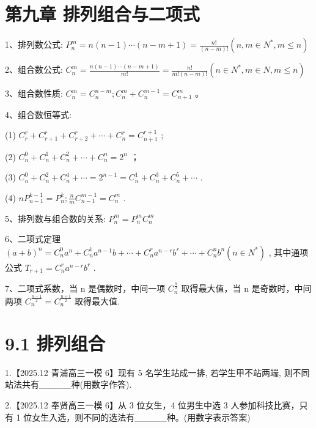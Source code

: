 \documentclass[10pt]{article}
\begin{document}
\section*{第九章 排列组合与二项式}

1、排列数公式: \({P}_{n}^{m} = n\left( {n - 1}\right) \cdots \left( {n - m + 1}\right)  = \frac{n!}{\left( {n - m}\right) !}\left( {n,m \in  {N}^{ * },m \leq  n}\right)\)

2、组合数公式: \({C}_{n}^{m} = \frac{n\left( {n - 1}\right) \cdots \left( {n - m + 1}\right) }{m!} = \frac{n!}{m!\left( {n - m}\right) !}\left( {n \in  {N}^{ * },m \in  N,m \leq  n}\right)\)

3、组合数性质: \({C}_{n}^{m} = {C}_{n}^{n - m};{C}_{n}^{m} + {C}_{n}^{m - 1} = {C}_{n + 1}^{m}\) 。

4、组合数恒等式:

(1) \({C}_{r}^{r} + {C}_{r + 1}^{r} + {C}_{r + 2}^{r} + \cdots  + {C}_{n}^{r} = {C}_{n + 1}^{r + 1}\) ;

(2) \({C}_{n}^{0} + {C}_{n}^{1} + {C}_{n}^{2} + \cdots  + {C}_{n}^{n} = {2}^{n}\) ；

(3) \({C}_{n}^{0} + {C}_{n}^{2} + {C}_{n}^{4} + \cdots  = {2}^{n - 1} = {C}_{n}^{1} + {C}_{n}^{3} + {C}_{n}^{5} + \cdots\) .

(4) \(n{P}_{n - 1}^{k - 1} = {P}_{n}^{k};\frac{n}{m}{C}_{n - 1}^{m - 1} = {C}_{n}^{m}\) .

5、排列数与组合数的关系: \({P}_{n}^{m} = {P}_{n}^{m}{C}_{n}^{m}\)

6、二项式定理 \({\left( a + b\right) }^{n} = {C}_{n}^{0}{a}^{n} + {C}_{n}^{1}{a}^{n - 1}b + \cdots  + {C}_{n}^{r}{a}^{n - r}{b}^{r} + \cdots  + {C}_{n}^{n}{b}^{n}\left( {n \in  {N}^{ * }}\right)\) , 其中通项公式 \({T}_{r + 1} = {C}_{n}^{r}{a}^{n - r}{b}^{r}\) .

7、二项式系数，当 \(\mathrm{n}\) 是偶数时，中间一项 \({C}_{n}^{\frac{n}{2}}\) 取得最大值，当 \(\mathrm{n}\) 是奇数时，中间两项 \({C}_{n}^{\frac{n - 1}{2}} = {C}_{n}^{\frac{n + 1}{2}}\) 取得最大值.

\section*{9.1 排列组合}

1.【2025.12 青浦高三一模 6】现有 5 名学生站成一排, 若学生甲不站两端, 则不同站法共有\_\_\_\_\_种(用数字作答).

2.【2025.12 奉贤高三一模 6】从 3 位女生，4 位男生中选 3 人参加科技比赛，只有 1 位女生入选，则不同的选法有\_\_\_\_\_种。(用数字表示答案)
\end{document}
